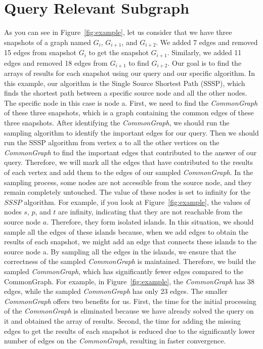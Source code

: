 \section{Query Relevant Subgraph}

As you can see in Figure~\ref{fig:example}, let us consider that we have three snapshots of a graph named $G_{i}$, $G_{i+1}$, and $G_{i+2}$. We added 7 edges and removed 15 edges from snapshot $G_{i}$ to get the snapshot $G_{i+1}$. Similarly, we added 11 edges and removed 18 edges from $G_{i+1}$ to find $G_{i+2}$. Our goal is to find the arrays of results for each snapshot using our query and our specific algorithm. In this example, our algorithm is the Single Source Shortest Path (SSSP), which finds the shortest path between a specific source node and all the other nodes. The specific node in this case is node a. First, we need to find the \emph{CommonGraph} of these three snapshots, which is a graph containing the common edges of these three snapshots. After identifying the \emph{CommonGraph}, we should run the sampling algorithm to identify the important edges for our query. Then we should run the SSSP algorithm from vertex $a$ to all the other vertices on the \emph{CommonGraph} to find the important edges that contributed to the answer of our query. Therefore, we will mark all the edges that have contributed to the results of each vertex and add them to the edges of our sampled \emph{CommonGraph}. In the sampling process, some nodes are not accessible from the source node, and they remain completely untouched. The value of these nodes is set to infinity for the $SSSP$ algorithm. For example, if you look at Figure~\ref{fig:example}, the values of nodes $s$, $p$, and $t$ are infinity, indicating that they are not reachable from the source node $a$. Therefore, they form isolated islands. In this situation, we should sample all the edges of these islands because, when we add edges to obtain the results of each snapshot, we might add an edge that connects these islands to the source node a. By sampling all the edges in the islands, we ensure that the correctness of the sampled \emph{CommonGraph} is maintained. Therefore, we build the sampled \emph{CommonGraph}, which has significantly fewer edges compared to the CommonGraph. For example, in Figure~\ref{fig:example}, the \emph{CommonGraph} has 38 edges, while the sampled \emph{CommonGraph} has only 23 edges. The smaller \emph{CommonGraph} offers two benefits for us. First, the time for the initial processing of the \emph{CommonGraph} is eliminated because we have already solved the query on it and obtained the array of results. Second, the time for adding the missing edges to get the results of each snapshot is reduced due to the significantly lower number of edges on the \emph{CommonGraph}, resulting in faster convergence. 



